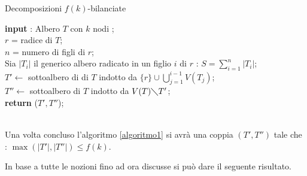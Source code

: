\begin{algorithm}[H]
	\label{algoritmo1}
	\SetAlgoLined
	\caption{Decomposizioni $ f(k) $-bilanciate }
	\textbf{input} : Albero $ T $ con $ k $ nodi ;\\ 	
	$ r $ = radice di $ T $;\\
	$ n $ = numero di figli di $ r $;\\ 
	Sia $ |T_i| $ il generico albero radicato in un figlio $ i $ di $ r $ :  $ S=\sum_{i=1}^{n}|T_i| $;\\
	{
		{
			$ T'\longleftarrow $ sottoalbero di  di $ T $ indotto da $ \{r\} \cup \bigcup_{j=1}^{i-1}V(T_j)$;\\
			$ T''\longleftarrow $ sottoalbero di $ T $ indotto da $ V(T) \diagdown T'$;\\
			\textbf{return} ($ T',T'' $);\\
		}	 
}
\end{algorithm}\mbox{}\\

Una volta concluso l'algoritmo \ref{algoritmo1} si avr\`a una coppia $ (T',T'') $ tale che : $ \max (|T'|,|T''|) \le f(k) $.

In base a tutte le nozioni fino ad ora discusse si pu\`o dare il seguente risultato.\mbox{}\\



